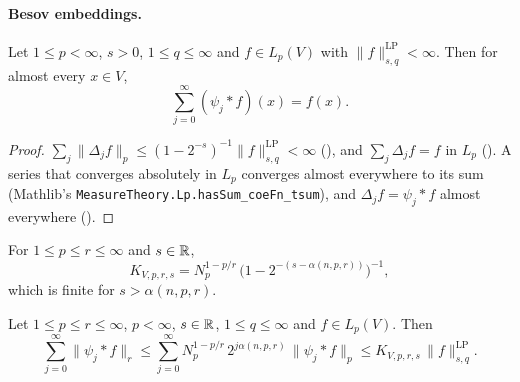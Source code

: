 \paragraph{Besov embeddings.}

\begin{lemma}
\label{lem:blocks-ae-convergence}
\leanok
{}
Let $1 \leq p < \infty$, $s > 0$, $1 \leq q \leq \infty$ and $f \in L_p(V)$ with
$\|f\|^{\mathrm{LP}}_{s,q} < \infty$. Then for almost every $x \in V$,
\[
  \sum_{j=0}^\infty (\psi_j * f)(x) = f(x) .
\]
\end{lemma}

\begin{proof}
\leanok
$\sum_j \|\Delta_j f\|_p \leq (1 - 2^{-s})^{-1} \|f\|^{\mathrm{LP}}_{s,q} < \infty$
(), and $\sum_j \Delta_j f = f$ in $L_p$ (). A series that
converges absolutely in $L_p$ converges almost everywhere to its sum (Mathlib's
\texttt{MeasureTheory.\allowbreak Lp.\allowbreak hasSum\_\allowbreak coeFn\_\allowbreak tsum}),
and $\Delta_j f = \psi_j * f$ almost everywhere ().
\end{proof}

\begin{definition}
\label{def:besov-embedding-const}
\leanok
{}
For $1 \leq p \leq r \leq \infty$ and $s \in \mathbb{R}$,
\[
  K_{V,p,r,s} = N_p^{1 - p/r} \, \bigl(1 - 2^{-(s - \alpha(n, p, r))}\bigr)^{-1} ,
\]
which is finite for $s > \alpha(n, p, r)$.
\end{definition}

\begin{lemma}
\label{lem:nikolskii-blocks-summable}
\leanok
{}
Let $1 \leq p \leq r \leq \infty$, $p < \infty$, $s \in \mathbb{R}$, $1 \leq q \leq \infty$ and
$f \in L_p(V)$. Then
\[
  \sum_{j=0}^\infty \|\psi_j * f\|_r
  \leq \sum_{j=0}^\infty N_p^{1 - p/r} \, 2^{j \alpha(n,p,r)} \, \|\psi_j * f\|_p
  \leq K_{V,p,r,s} \, \|f\|^{\mathrm{LP}}_{s,q} .
\]
\end{lemma}

